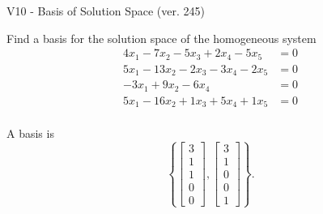 \begin{exercise}
  \begin{exerciseTitle}V10 - Basis of Solution Space (ver. 245)\end{exerciseTitle}
  \begin{exerciseStatement}
    Find a basis for the solution space of the homogeneous system 
\begin{align*}
 4 x_ 1 -7 x_ 2 -5 x_ 3 + 2 x_ 4 -5 x_ 5 &= 0  \\ 
  5 x_ 1 -13 x_ 2 -2 x_ 3 -3 x_ 4 -2 x_ 5 &= 0  \\ 
  -3 x_ 1 + 9 x_ 2 -6 x_ 4 &= 0  \\ 
  5 x_ 1 -16 x_ 2 + 1 x_ 3 + 5 x_ 4 + 1 x_ 5 &= 0  \\ 
 \end{align*}


 
  \end{exerciseStatement}

  \begin{exerciseAnswer}
   A basis is   
\[\left\{\left[\begin{array}{c}
3 \\
1 \\
1 \\
0 \\
0
\end{array}\right] , \left[\begin{array}{c}
3 \\
1 \\
0 \\
0 \\
1
\end{array}\right]\right\}.\]

  


  \end{exerciseAnswer}
\end{exercise}